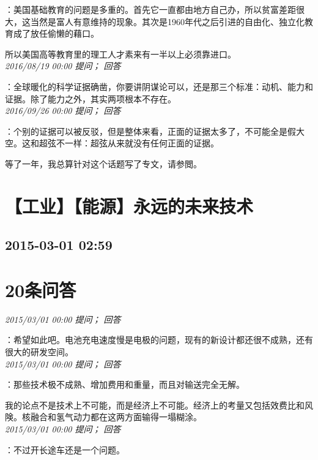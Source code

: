 \documentclass[twocolumn]{ctexart}
\begin{document}
：美国基础教育的问题是多重的。首先它一直都由地方自己办，所以贫富差距很大，这当然是富人有意维持的现象。其次是1960年代之后引进的自由化、独立化教育成了放任偷懒的藉口。

所以美国高等教育里的理工人才素来有一半以上必须靠进口。\\

\textit{\hfill\noindent\small 2016/08/19 00:00 提问； 回答}

：全球暖化的科学证据确凿，你要讲阴谋论可以，还是那三个标准：动机、能力和证据。除了能力之外，其实两项根本不存在。\\

\textit{\hfill\noindent\small 2016/09/26 00:00 提问； 回答}

：个别的证据可以被反驳，但是整体来看，正面的证据太多了，不可能全是假大空。这和超弦不一样：超弦从来就没有任何正面的证据。

等了一年，我总算针对这个话题写了专文，请参閲。\\


\section{【工业】【能源】永远的未来技术}
\subsection{2015-03-01 02:59}


\section{20条问答}

\textit{\hfill\noindent\small 2015/03/01 00:00 提问； 回答}

：希望如此吧。电池充电速度慢是电极的问题，现有的新设计都还很不成熟，还有很大的研发空间。\\

\textit{\hfill\noindent\small 2015/03/01 00:00 提问； 回答}

：那些技术极不成熟、增加费用和重量，而且对输送完全无解。

我的论点不是技术上不可能，而是经济上不可能。经济上的考量又包括效费比和风険。核融合和氢气动力都在这两方面输得一塌糊涂。\\

\textit{\hfill\noindent\small 2015/03/01 00:00 提问； 回答}

：不过开长途车还是一个问题。
\end{document}
